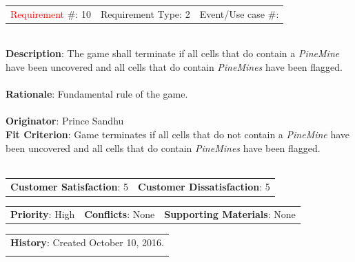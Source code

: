 \documentclass[12pt, titlepage]{article}
\begin{document}
\begin{reqbox}

\begin{tabular}{lll}
\textcolor{red}{Requirement} \#: 10 & Requirement Type: 2 & Event/Use case \#: \\ %
\end{tabular} \\

\textbf{Description}: The game shall terminate if all cells that do contain a \textit{PineMine} have been uncovered and
all cells that do contain \textit{PineMines} have been flagged. \\ \\
\textbf{Rationale}: Fundamental rule of the game. \\ \\
\textbf{Originator}: Prince Sandhu \\
\textbf{Fit Criterion}: Game terminates if all cells that do not contain a \textit{PineMine} have been uncovered and
all cells that do contain \textit{PineMines} have been flagged. \\ \\

\begin{tabular}{ll}
\textbf{Customer Satisfaction}: 5 & \textbf{Customer Dissatisfaction}: 5 \\
\end{tabular}

\begin{tabular}{lll}
\textbf{Priority}: High & \textbf{Conflicts}: None & \textbf{Supporting Materials}: None \\
\end{tabular}

\begin{tabular}{l}
\textbf{History}: Created October 10, 2016.\\ \\
\end{tabular} \\

\end{reqbox}
\end{document}
